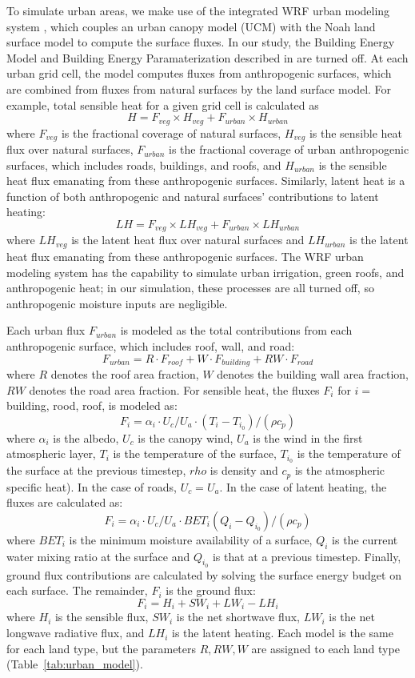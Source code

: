 \documentclass[draft,linenumbers]{agujournal}
\begin{document}
To simulate urban areas, we make use of the integrated WRF urban modeling system \citep{chen2011integrated}, which couples an urban canopy model (UCM) with the Noah land surface model to compute the surface fluxes. In our study, the Building Energy Model and Building Energy Paramaterization described in \cite{chen2011integrated} are turned off. 
At each urban grid cell, the model computes fluxes from anthropogenic surfaces, which are combined from fluxes from natural surfaces by the land surface model. 
For example, total sensible heat for a given grid cell is calculated as \[ H = F_{veg} \times H_{veg} + F_{urban}\times H_{urban}\]
where $F_{veg}$ is the fractional coverage of natural surfaces, $H_{veg}$ is the sensible heat flux over natural surfaces, $F_{urban}$ is the fractional coverage of urban anthropogenic surfaces, which includes roads, buildings, and roofs, and $H_{urban}$ is the sensible heat flux emanating from these anthropogenic surfaces. Similarly, latent heat is a function of both anthropogenic and natural surfaces' contributions to latent heating: 
\[LH = F_{veg} \times LH_{veg} + F_{urban}\times LH_{urban}\]
where $LH_{veg}$ is the latent heat flux over natural surfaces and $LH_{urban}$ is the latent heat flux emanating from these anthropogenic surfaces.
The WRF urban modeling system has the capability to simulate urban irrigation, green roofs, and anthropogenic heat; in our simulation, these processes are all turned off, so anthropogenic moisture inputs are negligible.

Each urban flux $F_{urban}$ is modeled as the total contributions from each anthropogenic surface, which includes roof, wall, and road: 
\[ F_{urban} = R\cdot F_{roof} + W\cdot F_{building} + RW\cdot F_{road} \]
where $R$ denotes the roof area fraction, $W$ denotes the building wall area fraction, $RW$ denotes the road area fraction. 
For sensible heat, the fluxes $F_i$ for $i=$building, rood, roof, is modeled as: 
\[F_i = \alpha_i\cdot U_c/U_a \cdot \left( T_i - T_{i_0}\right) / \left( \rho c_p \right ) \] 
where $\alpha_i $ is the albedo, $U_c$ is the canopy wind, $U_a$ is the wind in the first atmospheric layer, $T_i$ is the temperature of the surface, $T_{i_0}$ is the temperature of the surface at the previous timestep, $rho$ is density and $c_p$ is the atmospheric specific heat). In the case of roads, $U_c = U_a$.
In the case of latent heating, the fluxes are calculated as: 
\[F_i = \alpha_i \cdot U_c/U_a \cdot BET_i \left( Q_i - Q_{i_0}\right) / \left( \rho c_p \right ) \] 
where $BET_i$ is the minimum moisture availability of a surface, $Q_i$ is the current water mixing ratio at the surface and $Q_{i_0}$ is that at a previous timestep.
Finally, ground flux contributions are calculated by solving the surface energy budget on each surface. The remainder, $F_i$ is the ground flux: 
\[ F_i = H_i +SW_i + LW_i - LH_i\]
where $H_i$ is the sensible flux, $SW_i$ is the net shortwave flux, $LW_i$ is the net longwave radiative flux, and $LH_i$ is the latent heating. 
Each model is the same for each land type, but the parameters $R, RW, W$ are assigned to each land type (Table~\ref{tab:urban_model}). 
\end{document}
